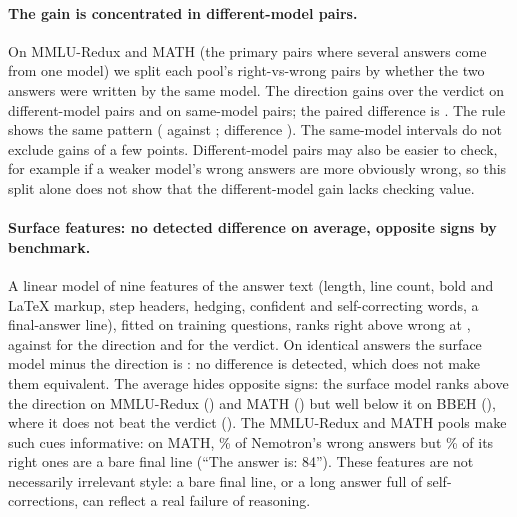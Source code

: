 \documentclass[11pt]{article}
\begin{document}
\paragraph{The gain is concentrated in different-model pairs.} On MMLU-Redux and MATH (the  primary pairs where several answers come from one model) we split each pool's right-vs-wrong pairs by whether the two answers were written by the same model. The direction gains  over the verdict on different-model pairs and  on same-model pairs; the paired difference is . The rule shows the same pattern ( against ; difference ). The same-model intervals do not exclude gains of a few points. Different-model pairs may also be easier to check, for example if a weaker model's wrong answers are more obviously wrong, so this split alone does not show that the different-model gain lacks checking value.

\paragraph{Surface features: no detected difference on average, opposite signs by benchmark.} A linear model of nine features of the answer text (length, line count, bold and \LaTeX{} markup, step headers, hedging, confident and self-correcting words, a final-answer line), fitted on training questions, ranks right above wrong at , against  for the direction and  for the verdict. On identical answers the surface model minus the direction is : no difference is detected, which does not make them equivalent. The average hides opposite signs: the surface model ranks above the direction on MMLU-Redux () and MATH () but well below it on BBEH (), where it does not beat the verdict (). The MMLU-Redux and MATH pools make such cues informative: on MATH, \% of Nemotron's wrong answers but \% of its right ones are a bare final line (``The answer is: 84''). These features are not necessarily irrelevant style: a bare final line, or a long answer full of self-corrections, can reflect a real failure of reasoning.
\end{document}
